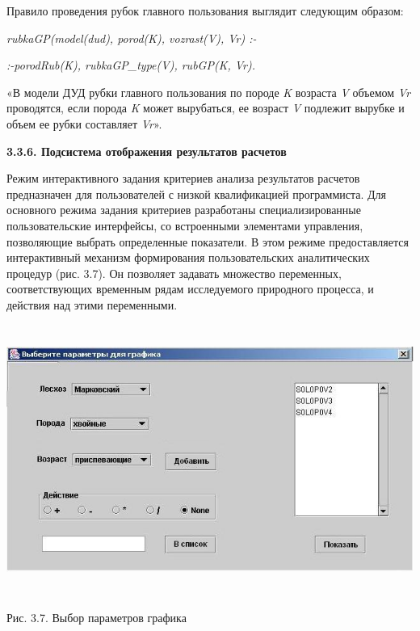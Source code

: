 \documentclass{article}
\begin{document}
Правило проведения рубок главного пользования 
выглядит следующим образом:

\begin{center}
\textit{rubkaGP(model(dud), porod(K), vozrast(V), Vr) :-         }

\textit{:-porodRub(K), rubkaGP\_type(V), rubGP(K, Vr).}
\end{center}

«В модели ДУД рубки главного пользования по 
породе \textit{K} возраста \textit{V} объемом \textit{Vr} 
проводятся, если порода \textit{K} может вырубаться, 
ее возраст \textit{V} подлежит вырубке и объем ее 
рубки составляет\textit{ Vr}».\label{HToc199746733}

\textbf{3.3.6. Подсистема отображения результатов 
расчетов}

Режим интерактивного задания критериев анализа 
результатов расчетов предназначен для пользователей 
с низкой квалификацией программиста. Для основного 
режима задания критериев разработаны специализированные 
пользовательские интерфейсы, со встроенными 
элементами управления, позволяющие выбрать 
определенные показатели. В этом режиме предоставляется 
интерактивный механизм формирования пользовательских 
аналитических процедур (рис. 3.7). Он позволяет 
задавать множество переменных, соответствующих 
временным рядам исследуемого природного процесса, 
и действия над этими переменными.

\begin{center}
\includegraphics[width=453pt, height=251pt, keepaspectratio=true]{asyaDisser9_3-fig004.jpg}

Рис. 3.7. Выбор параметров графика
\end{center}
\end{document}
